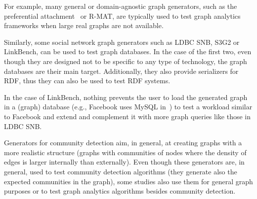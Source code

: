 For example, many general or domain-agnostic graph generators, such as the
preferential attachment~\cite{Barabasi99emergenceScaling} or R-MAT, are typically used to test graph analytics frameworks when large real graphs are not available. %

Similarly, some social network graph generators such as LDBC SNB, S3G2 or
LinkBench, can be used to test graph databases. In the case of the first two,
even though they are designed not to be specific to any type of technology,
the graph databases are their main target.  Additionally, they also provide serializers for
RDF, thus they can also be used to test RDF systems.

In the case of LinkBench, nothing prevents the user to load the generated graph
in a (graph) database (e.g., Facebook uses MySQL in~\cite{Armstrong:2013:LDB:2463676.2465296}) to
test a workload similar to Facebook and extend and complement it with more
graph queries like those in LDBC SNB.

Generators for community detection aim, in general, at creating graphs with a
more realistic structure (graphs with communities of nodes where the density of
edges is larger internally than externally). Even though these generators are,
in general, used to test community detection algorithms (they generate also the
expected communities in the graph), some studies also use them for general graph
purposes or to test graph analytics algorithms besides community detection.
